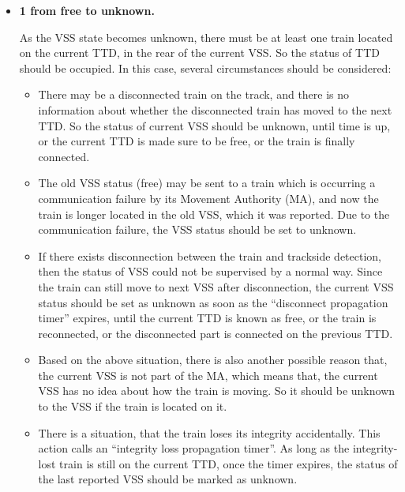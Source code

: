 \documentclass[article,dr=phil,type=drfinal,colorback,accentcolor=tud9c]{tudthesis}
\begin{document}
  \begin{itemize}
  	
  	\item \textbf{1 from free to unknown.}
  	
  	As the VSS state becomes unknown, there must be at least one train located on the current TTD, in the rear of the current VSS. So the status of TTD should be occupied. In this case, several circumstances should be considered:
  	
  	\begin{itemize}
  	
  	\item
  	
  	There may be a disconnected train on the track, and there is no information about whether the disconnected train has moved to the next TTD. So the status of current VSS should be unknown, until time is up, or the current TTD is made sure to be free, or the train is finally connected.
  	
  	\item 
  	
  	The old VSS status (free) may be sent to a train which is occurring a communication failure by its Movement Authority (MA), and now the train is longer located in the old VSS, which it was reported. Due to the communication failure, the VSS status should be set to unknown.
  	
  	\item 
  	
  	If there exists disconnection between the train and trackside detection, then the status of VSS could not be supervised by a normal way. Since the train can still move to next VSS after disconnection, the current VSS status should be set as unknown as soon as the ``disconnect propagation timer'' expires, until the current TTD is known as free, or the train is reconnected, or the disconnected part is connected on the previous TTD.
  	
  	\item 
  	
  	Based on the above situation, there is also another possible reason that, the current VSS is not part of the MA, which means that, the current VSS has no idea about how the train is moving. So it should be unknown to the VSS if the train is located on it.
  	
  	\item 
  	
  	There is a situation, that the train loses its integrity accidentally. This action calls an ``integrity loss propagation timer''. As long as the integrity-lost train is still on the current TTD, once the timer expires, the status of the last reported VSS should be marked as unknown.
  	

\end{itemize}
\end{itemize}
\end{document}
